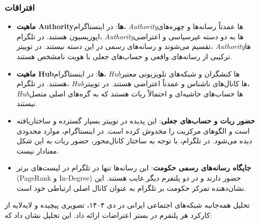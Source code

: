 \documentclass{article}
\begin{document}
	\subsubsection*{افتراقات}
	\begin{itemize}
		\item \textbf{ماهیت Authorityها}: در اینستاگرام، \textit{Authority}ها عمدتاً رسانه‌ها و چهره‌های اپوزیسیون هستند. در تلگرام، \textit{Authority}ها به دو دسته غیرسیاسی و اعتراضی تقسیم می‌شوند و رسانه‌های رسمی در این دسته نیستند. در توییتر، \textit{Authority}ها ترکیبی از رسانه‌های واقعی و حساب‌های جعلی با هویت نامشخص هستند.
		\item \textbf{ماهیت Hubها}: در اینستاگرام، \textit{Hub}ها کنشگران و شبکه‌های تلویزیونی معتبر هستند. در تلگرام، \textit{Hub}ها کانال‌های ناشناس و عمدتاً اعتراضی هستند. در توییتر، \textit{Hub}ها حساب‌های حاشیه‌ای و احتمالاً ربات هستند که به گره‌های اصلی متصل نیستند.
		\item \textbf{حضور ربات و حساب‌های جعلی}: این پدیده در توییتر بسیار گسترده و ساختاریافته است و الگوهای مرکزیت را مخدوش کرده است. در اینستاگرام، موارد محدودی دیده می‌شود. در تلگرام، با توجه به ساختار کانال‌محور، حضور ربات به این شکل معنادار نیست.
		\item \textbf{جایگاه رسانه‌های رسمی حکومت}: این رسانه‌ها تنها در تلگرام در لیست‌های برتر (PageRank و In-Degree) حضور دارند و در دو پلتفرم دیگر غایب هستند. این نشان‌دهنده تمرکز حکومت بر تلگرام به عنوان کانال اصلی ارتباطی خود است.
	\end{itemize}
	
	\newpage
	
	تحلیل همه‌جانبه شبکه‌های اجتماعی ایرانی در دی ۱۴۰۴، تصویری پیچیده و لایه‌لایه از کارکرد هر پلتفرم در بستر اعتراضات ارائه داد. این تحلیل نشان داد که:
	
\end{document}
